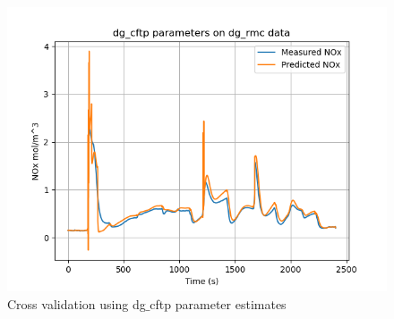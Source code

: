 \begin{figure}[H]
\begin{minipage}{0.33\textwidth}
        \end{minipage}
        \begin{minipage}{0.33\textwidth}
                \includegraphics[width = \textwidth]{./figs/figs_new_mdl/dg_cftp_dg_rmc.png}
        \end{minipage}
        \caption{Cross validation using dg$\_$cftp parameter estimates}
\end{figure}

